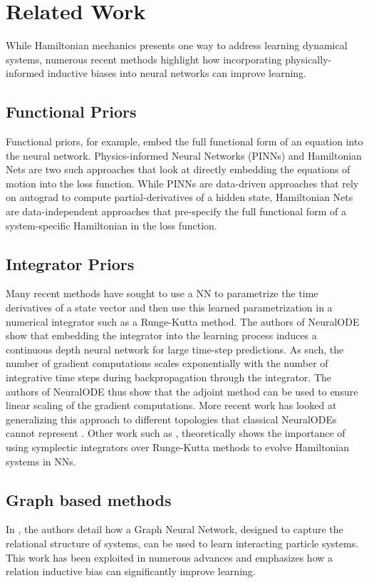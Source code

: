 \documentclass{article}
\begin{document}
\section{Related Work}

While Hamiltonian mechanics presents one way to address learning dynamical systems, numerous recent methods highlight how incorporating physically-informed inductive biases into neural networks can improve learning.

\subsection*{Functional Priors}
Functional priors, for example, embed the full functional form of an equation into the neural network. Physics-informed Neural Networks (PINNs) \cite{raissi_physics_2017,raissi_physics-informed_2019} and Hamiltonian Nets \cite{mattheakis_hamiltonian_2020} are two such approaches that look at directly embedding the equations of motion into the loss function. While PINNs are data-driven approaches that rely on autograd to compute partial-derivatives of a hidden state, Hamiltonian Nets are data-independent approaches that pre-specify the full functional form of a system-specific Hamiltonian in the loss function.

\subsection*{Integrator Priors}
Many recent methods have sought to use a NN to parametrize the time derivatives of a state vector and then use this learned parametrization in a numerical integrator such as a Runge-Kutta method. The authors of NeuralODE \cite{chen_neural_2018} show that embedding the integrator into the learning process induces a continuous depth neural network for large time-step predictions. As such, the number of gradient computations scales exponentially with the number of integrative time steps during backpropagation through the integrator. The authors of NeuralODE thus show that the adjoint method can be used to ensure linear scaling of the gradient computations. More recent work has looked at generalizing this approach to different topologies that classical NeuralODEs cannot represent \cite{dupont_augmented_2019}. Other work such as \cite{zhu_deep_2020}, theoretically shows the importance of using symplectic integrators over Runge-Kutta methods to evolve Hamiltonian systems in NNs.

\subsection*{Graph based methods}
In \cite{battaglia_interaction_2016}, the authors detail how a Graph Neural Network, designed to capture the relational structure of systems, can be used to learn interacting particle systems. This work has been exploited in numerous advances \cite{sanchez-gonzalez_graph_2018,sanchez-gonzalez_learning_2020,cranmer_lagrangian_2020} and emphasizes how a relation inductive bias can significantly improve learning.
\end{document}
